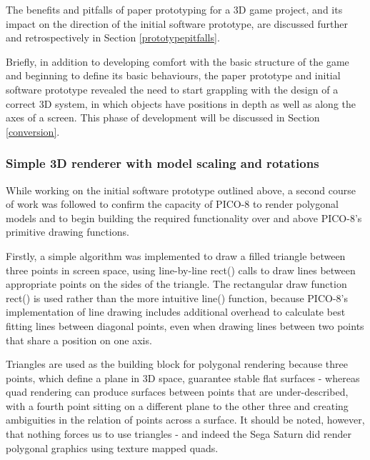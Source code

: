\documentclass[11pt]{article}
\begin{document}
The benefits and pitfalls of paper prototyping for a 3D game project, and its impact on the
direction of the initial software prototype, are discussed further and retrospectively in
Section \ref{prototypepitfalls}.

Briefly, in addition to developing comfort with the basic structure of the game and beginning
to define its basic behaviours, the paper prototype and initial software prototype revealed the
need to start grappling with the design of a correct 3D system, in which objects have positions
in depth as well as along the axes of a screen. This phase of development will be discussed in
Section \ref{conversion}.

\subsubsection*{Simple 3D renderer with model scaling and rotations}


While working on the initial software prototype outlined above, a second course of work
was followed to confirm the capacity of PICO-8 to render polygonal models and to begin
building the required functionality over and above PICO-8's primitive drawing functions.

Firstly, a simple algorithm was implemented to draw a filled triangle between three points
in screen space, using line-by-line rect() calls to draw lines between appropriate points on the
sides of the triangle. The rectangular draw function rect() is used
rather than the more intuitive line() function, because PICO-8's implementation of line drawing
includes additional overhead to calculate best fitting lines between diagonal points, even when
drawing lines between two points that share a position on one axis.

Triangles are used as the building block for polygonal rendering because three points, which define
a plane in 3D space, guarantee stable flat surfaces - whereas quad rendering can produce surfaces
between points that are under-described, with a fourth point sitting on a different plane to the
other three and creating ambiguities in the relation of points across a surface. It should be
noted, however, that nothing forces us to use triangles - and indeed the Sega Saturn did render
polygonal graphics using texture mapped quads.
\end{document}
